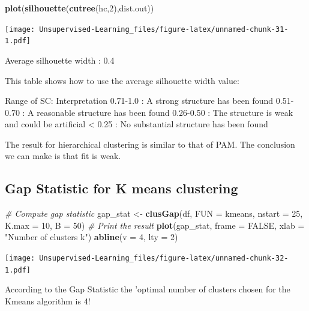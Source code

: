\documentclass[
]{book}
\newenvironment{Shaded}{\begin{snugshade}}{\end{snugshade}}
\newcommand{\CommentTok}[1]{\textcolor[rgb]{0.56,0.35,0.01}{\textit{#1}}}
\newcommand{\DataTypeTok}[1]{\textcolor[rgb]{0.13,0.29,0.53}{#1}}
\newcommand{\DecValTok}[1]{\textcolor[rgb]{0.00,0.00,0.81}{#1}}
\newcommand{\KeywordTok}[1]{\textcolor[rgb]{0.13,0.29,0.53}{\textbf{#1}}}
\newcommand{\NormalTok}[1]{#1}
\newcommand{\OtherTok}[1]{\textcolor[rgb]{0.56,0.35,0.01}{#1}}
\newcommand{\StringTok}[1]{\textcolor[rgb]{0.31,0.60,0.02}{#1}}
\begin{document}
\begin{Shaded}
\begin{Highlighting}[]
\KeywordTok{plot}\NormalTok{(}\KeywordTok{silhouette}\NormalTok{(}\KeywordTok{cutree}\NormalTok{(hc,}\DecValTok{2}\NormalTok{),dist.out))}
\end{Highlighting}
\end{Shaded}

\texttt{[image: Unsupervised-Learning\_files/figure-latex/unnamed-chunk-31-1.pdf]}

Average silhouette width : 0.4

This table shows how to use the average silhouette width value:

Range of SC: Interpretation
0.71-1.0 : A strong structure has been found
0.51-0.70 : A reasonable structure has been found
0.26-0.50 : The structure is weak and could be artificial
\textless{} 0.25 : No substantial structure has been found

The result for hierarchical clustering is similar to that of PAM. The conclusion we can make is that fit is weak.

\hypertarget{gap-statistic-for-k-means-clustering}{%
\subsection{Gap Statistic for K means clustering}\label{gap-statistic-for-k-means-clustering}}

\begin{Shaded}
\begin{Highlighting}[]
\CommentTok{# Compute gap statistic}
\NormalTok{gap_stat <-}\StringTok{ }\KeywordTok{clusGap}\NormalTok{(df, }\DataTypeTok{FUN =}\NormalTok{ kmeans, }\DataTypeTok{nstart =} \DecValTok{25}\NormalTok{, }\DataTypeTok{K.max =} \DecValTok{10}\NormalTok{, }\DataTypeTok{B =} \DecValTok{50}\NormalTok{)}
\CommentTok{# Print the result}
\KeywordTok{plot}\NormalTok{(gap_stat, }\DataTypeTok{frame =} \OtherTok{FALSE}\NormalTok{, }\DataTypeTok{xlab =} \StringTok{"Number of clusters k"}\NormalTok{)}
\KeywordTok{abline}\NormalTok{(}\DataTypeTok{v =} \DecValTok{4}\NormalTok{, }\DataTypeTok{lty =} \DecValTok{2}\NormalTok{)}
\end{Highlighting}
\end{Shaded}

\texttt{[image: Unsupervised-Learning\_files/figure-latex/unnamed-chunk-32-1.pdf]}

According to the Gap Statistic the 'optimal number of clusters chosen for the Kmeans algorithm is 4!
\end{document}
